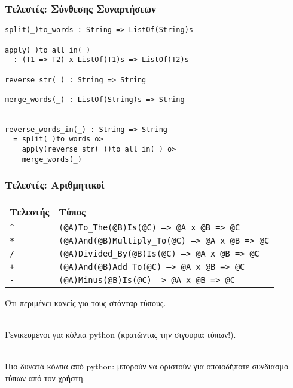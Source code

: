 \documentclass{beamer}
\def\e{\foreignlanguage{english}}
\begin{document}
\begin{frame}[fragile]

\frametitle{Τελεστές: Σύνθεσης Συναρτήσεων}

\begin{otherlanguage}{english}
\begin{verbatim}
split(_)to_words : String => ListOf(String)s

apply(_)to_all_in(_)
  : (T1 => T2) x ListOf(T1)s => ListOf(T2)s

reverse_str(_) : String => String

merge_words(_) : ListOf(String)s => String


reverse_words_in(_) : String => String
  = split(_)to_words o>
    apply(reverse_str(_))to_all_in(_) o>
    merge_words(_)
\end{verbatim}
\end{otherlanguage}

\end{frame}

\begin{frame}

\frametitle{Τελεστές: Αριθμητικοί}

\begin{center}
\begin{tabular}{ |P{1.5cm}|P{8.9cm}| }
 \hline
 Τελεστής & Τύπος
 \\
 \hline
 \e{\texttt{\^}} & \e{\texttt{(@A)To\_The(@B)Is(@C) --> @A x @B => @C}}
 \\
 \e{\texttt{*}} & \e{\texttt{(@A)And(@B)Multiply\_To(@C) --> @A x @B => @C}}
 \\
 \e{\texttt{/}} & \e{\texttt{(@A)Divided\_By(@B)Is(@C) --> @A x @B => @C}}
 \\
 \e{\texttt{+}} & \e{\texttt{(@A)And(@B)Add\_To(@C) --> @A x @B => @C}}
 \\
 \e{\texttt{-}} & \e{\texttt{(@A)Minus(@B)Is(@C) --> @A x @B => @C}}
 \\
 \hline
\end{tabular}
\end{center}

Ότι περιμένει κανείς για τους στάνταρ τύπους.
\\~\

Γενικευμένοι για κόλπα \e{python} (κρατώντας την σιγουριά τύπων!).
\\~\

Πιο δυνατά κόλπα από \e{python}: μπορούν να οριστούν για οποιοδήποτε
συνδιασμό τύπων από τον χρήστη.

\end{frame}
\end{document}
